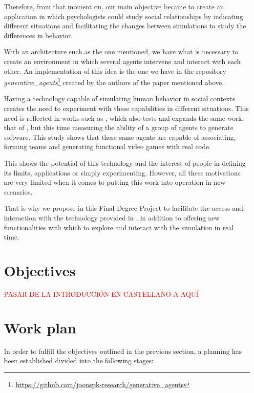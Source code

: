 Therefore, from that moment on, our main objective became to create an application in which psychologists could study social relationships by indicating different situations and facilitating the changes between simulations to study the differences in behavior.

With an architecture such as the one mentioned, we have what is necessary to create an environment in which several agents intervene and interact with each other. An implementation of this idea is the one we have in the repository {\textit{generative\_agents}}\footnote{\url{https://github.com/joonspk-research/generative_agents}} created by the authors of the paper mentioned above.

Having a technology capable of simulating human behavior in social contexts creates the need to experiment with these capabilities in different situations. This need is reflected in works such as \cite{qian2023communicative}, which also tests and expands the same work, that of \cite{park2023generative}, but this time measuring the ability of a group of agents to generate software. This study shows that these same agents are capable of associating, forming teams and generating functional video games with real code.

This shows the potential of this technology and the interest of people in defining its limits, applications or simply experimenting. However, all these motivations are very limited when it comes to putting this work into operation in new scenarios.

That is why we propose in this Final Degree Project to facilitate the access and interaction with the technology provided in \ga, in addition to offering new functionalities with which to explore and interact with the simulation in real time.

\section{Objectives}
\textcolor{red}{PASAR DE LA INTRODUCCIÓN EN CASTELLANO A AQUÍ}

\section{Work plan}

In order to fulfill the objectives outlined in the previous section, a planning has been established divided into the following stages:

